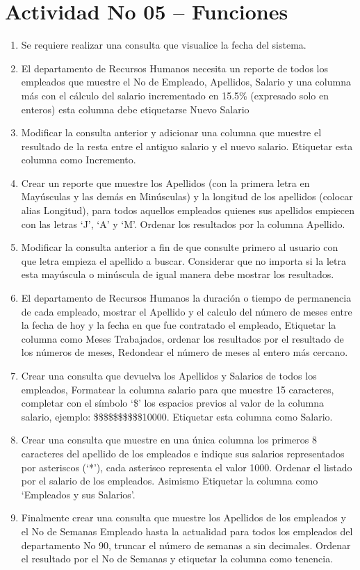 \section{Actividad No 05 – Funciones} 
		
\begin{enumerate}[1.]
	\item Se requiere realizar una consulta que visualice la fecha del sistema.
	\item El departamento de Recursos Humanos necesita un reporte de todos los empleados que muestre el No de Empleado, Apellidos, Salario y una columna más con el cálculo del salario incrementado en 15.5\% (expresado solo en enteros) esta columna debe etiquetarse Nuevo Salario
	\item Modificar la consulta anterior y adicionar una columna que muestre el resultado de la resta entre el antiguo salario y el nuevo salario. Etiquetar esta columna como Incremento.
	\item Crear un reporte que muestre los Apellidos (con la primera letra en May\'usculas y las demás en Min\'usculas) y la longitud de los apellidos (colocar alias Longitud), para todos aquellos empleados quienes sus apellidos empiecen con las letras ‘J’, ‘A’ y ‘M’. Ordenar los resultados por la columna Apellido.
	\item Modificar la consulta anterior a fin de que consulte primero al usuario con que letra empieza el apellido a buscar. Considerar que no importa si la letra esta may\'uscula o min\'uscula de igual manera debe mostrar los resultados.
	\item El departamento de Recursos Humanos la duración o tiempo de permanencia de cada empleado, mostrar el Apellido y el calculo del número de meses entre la fecha de hoy y la fecha en que fue contratado el empleado, Etiquetar la columna como Meses Trabajados, ordenar los resultados por el resultado de los n\'umeros de meses, Redondear el número de meses al entero más cercano.
	\item Crear una consulta que devuelva los Apellidos y Salarios de todos los empleados, Formatear la columna salario para que muestre 15 caracteres, completar con el símbolo ‘\$’ los espacios previos al valor de la columna salario, ejemplo: \$\$\$\$\$\$\$\$\$\$10000. Etiquetar esta columna como Salario.
	\item Crear una consulta que muestre en una única columna los primeros 8 caracteres del apellido de los empleados e indique sus salarios representados por asteriscos (‘*’), cada asterisco representa el valor 1000. Ordenar el listado por el salario de los empleados. Asimismo Etiquetar la columna como ‘Empleados y sus Salarios’.
	\item Finalmente crear una consulta que muestre los Apellidos de los empleados y el No de Semanas Empleado hasta la actualidad para todos los empleados del departamento No 90, truncar el número de semanas a sin decimales. Ordenar el resultado por el No de Semanas y etiquetar la columna como tenencia.
\end{enumerate}

